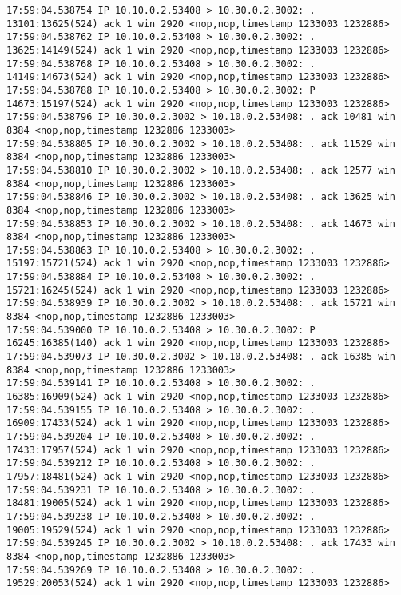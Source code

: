 \documentclass[a4paper,12pt]{article}
\begin{document}
\begin{Verbatim}
17:59:04.538754 IP 10.10.0.2.53408 > 10.30.0.2.3002: . 13101:13625(524) ack 1 win 2920 <nop,nop,timestamp 1233003 1232886>
17:59:04.538762 IP 10.10.0.2.53408 > 10.30.0.2.3002: . 13625:14149(524) ack 1 win 2920 <nop,nop,timestamp 1233003 1232886>
17:59:04.538768 IP 10.10.0.2.53408 > 10.30.0.2.3002: . 14149:14673(524) ack 1 win 2920 <nop,nop,timestamp 1233003 1232886>
17:59:04.538788 IP 10.10.0.2.53408 > 10.30.0.2.3002: P 14673:15197(524) ack 1 win 2920 <nop,nop,timestamp 1233003 1232886>
17:59:04.538796 IP 10.30.0.2.3002 > 10.10.0.2.53408: . ack 10481 win 8384 <nop,nop,timestamp 1232886 1233003>
17:59:04.538805 IP 10.30.0.2.3002 > 10.10.0.2.53408: . ack 11529 win 8384 <nop,nop,timestamp 1232886 1233003>
17:59:04.538810 IP 10.30.0.2.3002 > 10.10.0.2.53408: . ack 12577 win 8384 <nop,nop,timestamp 1232886 1233003>
17:59:04.538846 IP 10.30.0.2.3002 > 10.10.0.2.53408: . ack 13625 win 8384 <nop,nop,timestamp 1232886 1233003>
17:59:04.538853 IP 10.30.0.2.3002 > 10.10.0.2.53408: . ack 14673 win 8384 <nop,nop,timestamp 1232886 1233003>
17:59:04.538863 IP 10.10.0.2.53408 > 10.30.0.2.3002: . 15197:15721(524) ack 1 win 2920 <nop,nop,timestamp 1233003 1232886>
17:59:04.538884 IP 10.10.0.2.53408 > 10.30.0.2.3002: . 15721:16245(524) ack 1 win 2920 <nop,nop,timestamp 1233003 1232886>
17:59:04.538939 IP 10.30.0.2.3002 > 10.10.0.2.53408: . ack 15721 win 8384 <nop,nop,timestamp 1232886 1233003>
17:59:04.539000 IP 10.10.0.2.53408 > 10.30.0.2.3002: P 16245:16385(140) ack 1 win 2920 <nop,nop,timestamp 1233003 1232886>
17:59:04.539073 IP 10.30.0.2.3002 > 10.10.0.2.53408: . ack 16385 win 8384 <nop,nop,timestamp 1232886 1233003>
17:59:04.539141 IP 10.10.0.2.53408 > 10.30.0.2.3002: . 16385:16909(524) ack 1 win 2920 <nop,nop,timestamp 1233003 1232886>
17:59:04.539155 IP 10.10.0.2.53408 > 10.30.0.2.3002: . 16909:17433(524) ack 1 win 2920 <nop,nop,timestamp 1233003 1232886>
17:59:04.539204 IP 10.10.0.2.53408 > 10.30.0.2.3002: . 17433:17957(524) ack 1 win 2920 <nop,nop,timestamp 1233003 1232886>
17:59:04.539212 IP 10.10.0.2.53408 > 10.30.0.2.3002: . 17957:18481(524) ack 1 win 2920 <nop,nop,timestamp 1233003 1232886>
17:59:04.539231 IP 10.10.0.2.53408 > 10.30.0.2.3002: . 18481:19005(524) ack 1 win 2920 <nop,nop,timestamp 1233003 1232886>
17:59:04.539238 IP 10.10.0.2.53408 > 10.30.0.2.3002: . 19005:19529(524) ack 1 win 2920 <nop,nop,timestamp 1233003 1232886>
17:59:04.539245 IP 10.30.0.2.3002 > 10.10.0.2.53408: . ack 17433 win 8384 <nop,nop,timestamp 1232886 1233003>
17:59:04.539269 IP 10.10.0.2.53408 > 10.30.0.2.3002: . 19529:20053(524) ack 1 win 2920 <nop,nop,timestamp 1233003 1232886>

\end{Verbatim}
\end{document}
